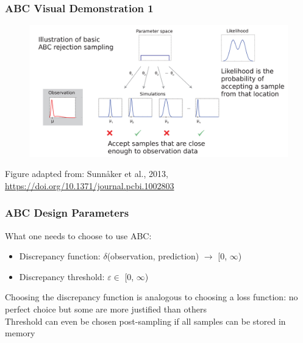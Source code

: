 \documentclass{beamer}
\begin{document}
\begin{frame}
\frametitle{ABC Visual Demonstration 1}
\vspace{-1em}
\begin{figure}[ht]
\centerline{\includegraphics[width=\columnwidth]{img/abc1.png}}
\end{figure}
\vspace{-1em}
\tiny{Figure adapted from: Sunn{\aa}ker et al., 2013, \url{https://doi.org/10.1371/journal.pcbi.1002803}}
\end{frame}

\begin{frame}
\frametitle{ABC Design Parameters}
What one needs to choose to use ABC:
\begin{itemize}
\item Discrepancy function: $\delta$(observation, prediction) $\rightarrow$ [0, $\infty$)
\item Discrepancy threshold: $\varepsilon \in$ [0, $\infty$)
\end{itemize}
\medskip
Choosing the discrepancy function is analogous to choosing a loss function: no perfect choice but some are more justified than others\\
\medskip
Threshold can even be chosen post-sampling if all samples can be stored in memory
\end{frame}

\newcommand{\filmslide}[1]{
\begin{frame}
 \frametitle{ABC Visual Demonstration 2}
 \begin{figure}[ht]
 \begin{center}
 \texttt{[image: ./film/\#1.png]}
 \end{center}
 \end{figure}
 \bigskip
 \tiny{From (slides): Kangasr\"a\"asi\"o et al., 2017, \url{http://dl.acm.org/citation.cfm?id=3025576}}
\end{frame}
}
\end{document}

